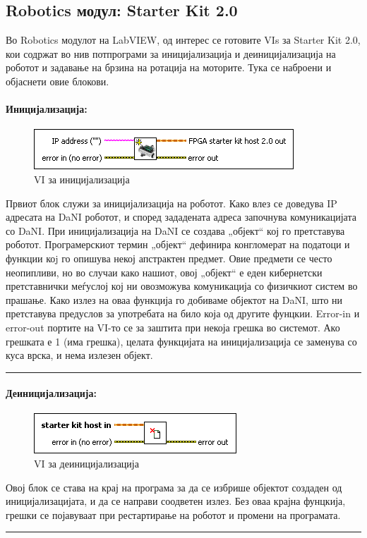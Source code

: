 \documentclass[12pt]{article}
\begin{document}
  \subsection{Robotics модул: Starter Kit 2.0}
    Во Robotics модулот на LabVIEW, од интерес се готовите VIs за Starter Kit 2.0, кои содржат во нив потпрограми за иницијализација и деиницијализација на роботот и задавање на брзина на ротација на моторите. Тука се наброени и објаснети овие блокови.

		\paragraph{Иницијализација:\\}
			\begin{figure}[h]
				\includegraphics[width=0.55\linewidth]{./images/init.png}
				\raggedright
				\caption{VI за иницијализација}
				\label{fig:init.png}
				\end{figure}
		  Првиот блок служи за иницијализација на роботот. Како влез се доведува IP адресата на DaNI роботот, и според зададената адреса започнува комуникацијата со DaNI. При иницијализација на DaNI се создава „објект“ кој го претставува роботот. Програмерскиот термин „објект“ дефинира конгломерат на податоци и функции коj го опишува некој апстрактен предмет. Овие предмети се често неопипливи, но во случаи како нашиот, овој „објект“ е еден кибернетски претставнички меѓуслој кој ни овозможува комуникација со физичкиот систем во прашање. Како излез на оваа функција го добиваме објектот на DaNI, што ни претставува предуслов за употребата на било која од другите фунцкии. Error-in и error-out портите на VI-то се за заштита при некоја грешка во системот. Ако грешката е 1 (има грешка), целата функцијата на иницијализација се заменува со куса врска, и нема излезен објект.
      \\
      \textcolor[RGB]{150,150,150}{\rule{\linewidth}{1.6pt}}

    \paragraph{Деиницијализација:\\}
    	\begin{figure}[h]
        \includegraphics[width = 0.55\linewidth]{./images/deinit.png}
				\raggedright
				\caption{VI за деиницијализација}
				\label{fig:deinit.png}
				\end{figure}
      Овој блок се става на крај на програма за да се избрише објектот создаден од иницијализацијата, и да се направи соодветен излез. Без оваа крајна фунцкија, грешки се појавуваат при рестартирање на роботот и промени на програмата.\\
      \textcolor[RGB]{150,150,150}{\rule{\linewidth}{1.6pt}}
\end{document}
